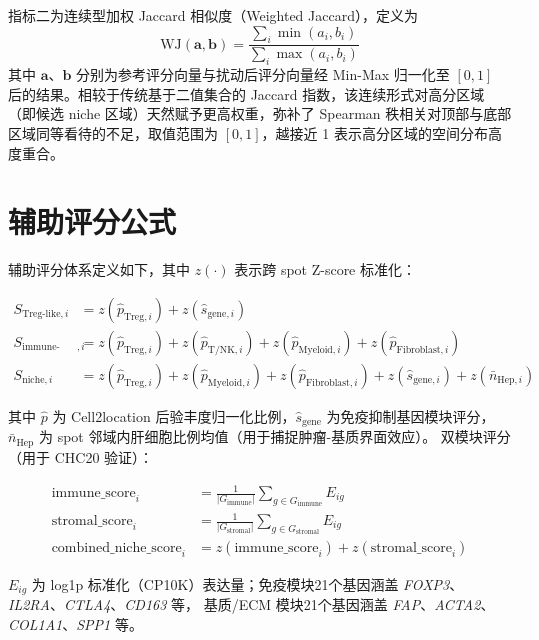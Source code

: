 \documentclass[12pt, a4paper]{ctexart}
\begin{document}
指标二为连续型加权 Jaccard 相似度（Weighted Jaccard），定义为
\begin{equation}
\text{WJ}(\mathbf{a}, \mathbf{b}) = \frac{\sum_i \min(a_i, b_i)}{\sum_i \max(a_i, b_i)}
\label{eq:weighted_jaccard}
\end{equation}
其中 $\mathbf{a}$、$\mathbf{b}$ 分别为参考评分向量与扰动后评分向量经 Min-Max 归一化至 $[0,1]$ 后的结果。相较于传统基于二值集合的 Jaccard 指数，该连续形式对高分区域（即候选 niche 区域）天然赋予更高权重，弥补了 Spearman 秩相关对顶部与底部区域同等看待的不足，取值范围为 $[0, 1]$，越接近 1 表示高分区域的空间分布高度重合。

\section{辅助评分公式}
\label{app:scores}

辅助评分体系定义如下，其中 $z(\cdot)$ 表示跨 spot Z-score 标准化：

\begin{align}
S_{\text{Treg-like},i} &= z(\hat{p}_{\text{Treg},i}) + z(\hat{s}_{\text{gene},i}) \\
S_{\text{immune-stroma},i} &= z(\hat{p}_{\text{Treg},i}) + z(\hat{p}_{\text{T/NK},i}) + z(\hat{p}_{\text{Myeloid},i}) + z(\hat{p}_{\text{Fibroblast},i}) \\
S_{\text{niche},i} &= z(\hat{p}_{\text{Treg},i}) + z(\hat{p}_{\text{Myeloid},i}) + z(\hat{p}_{\text{Fibroblast},i}) + z(\hat{s}_{\text{gene},i}) + z(\bar{n}_{\text{Hep},i})
\end{align}

其中 $\hat{p}$ 为 Cell2location 后验丰度归一化比例，$\hat{s}_{\text{gene}}$ 为免疫抑制基因模块评分，
$\bar{n}_{\text{Hep}}$ 为 spot 邻域内肝细胞比例均值（用于捕捉肿瘤-基质界面效应）。
双模块评分（用于 CHC20 验证）：

\begin{align}
\text{immune\_score}_i &= \frac{1}{|G_{\text{immune}}|}\sum_{g \in G_{\text{immune}}} E_{ig} \\
\text{stromal\_score}_i &= \frac{1}{|G_{\text{stromal}}|}\sum_{g \in G_{\text{stromal}}} E_{ig} \\
\text{combined\_niche\_score}_i &= z(\text{immune\_score}_i) + z(\text{stromal\_score}_i)
\end{align}

$E_{ig}$ 为 log1p 标准化（CP10K）表达量；免疫模块21个基因涵盖 \textit{FOXP3}、\textit{IL2RA}、\textit{CTLA4}、\textit{CD163} 等，
基质/ECM 模块21个基因涵盖 \textit{FAP}、\textit{ACTA2}、\textit{COL1A1}、\textit{SPP1} 等。
\end{document}
